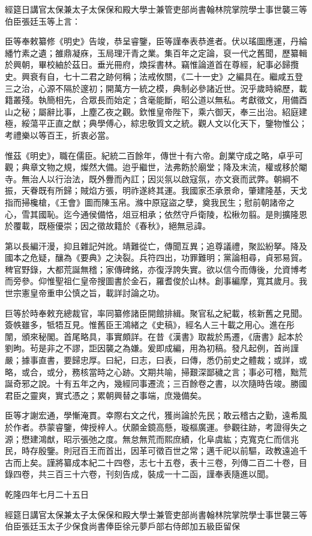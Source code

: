 
\begin{pinyinscope}
經筵日講官太保兼太子太保保和殿大學士兼管吏部尚書翰林院掌院學士事世襲三等伯臣張廷玉等上言：

臣等奉敕纂修《明史》告竣，恭呈睿鑒，臣等謹奉表恭進者。伏以瑤圖應運，丹綸繙竹素之遺；雒鼎凝庥，玉局理汗青之業。集百年之定論，裒一代之舊聞，歷纂輯於興朝，畢校紬於茲日。垂光冊府，煥採書林。竊惟論道首在尊經，紀事必歸攬史。興衰有自，七十二君之跡何稱；法戒攸關，《二十一史》之編具在。繼咸五登三之治，心源不隔於邃初；開萬方一統之模，典制必參諸近世。況乎歲時綿歷，載籍叢殘。執簡相先，合眾長而始定；含毫能斷，昭公道以無私。考獻徵文，用備酉山之秘；屬辭比事，上塵乙夜之觀。欽惟皇帝陛下，乘六御天，奉三出治。紹庭建極，綏蕩平正直之猷；典學傅心，綜忠敬質文之統。觀人文以化天下，鑒物惟公；考禮樂以等百王，折衷必當。

惟茲《明史》，職在儒臣。紀統二百餘年，傳世十有六帝。創業守成之略，卓乎可觀；典章文物之規，燦然大備。迨乎繼世，法弗飭於廟堂；降及末流，權或移於閹寺。無治人以行治法，既外釁而內訌；因災氛以啟寇氛，亦文衰而武弊。朝綱不振，天眷既有所歸；賊焰方張，明祚遂終其運。我國家丕承景命，肇建隆基，天戈指而掃欃槍，《王會》圖而陳玉帛。滌中原寇盜之孽，奠我民生；慰前朝諸帝之心，雪其國恥。迄今通侯備恪，俎豆相承；依然守戶衛陵，松楸勿翦。是則擴隆恩於覆載，既極優崇；因之徵故籍於《春秋》，絕無忌諱。

第以長編汗漫，抑且雜記舛訛。靖難從亡，傳聞互異；追尊議禮，聚訟紛拏。降及國本之危疑，釀為《要典》之決裂。兵符四出，功罪難明；黨論相尋，貞邪易貿。稗官野錄，大都荒誕無稽；家傳碑銘，亦復浮誇失實。欲以信今而傳後，允資博考而旁參。仰惟聖祖仁皇帝搜圖書於金石，羅耆俊於山林。創事編摩，寬其歲月。我世宗憲皇帝重申公慎之旨，載詳討論之功。

巨等於時奉敕充總裁官，率同纂修諸臣開館排緝。聚官私之紀載，核新舊之見聞。簽帙雖多，牴牾互見。惟舊臣王鴻緒之《史稿》，經名人三十載之用心。進在彤闈，頒來秘閣。首尾略具，事實頗詳。在昔《漢書》取裁於馬遷，《唐書》起本於劉昫。茍是非之不謬，詎因襲之為嫌。爰即成編，用為初稿。發凡起例，首尚謹嚴；據事直書，要歸忠厚。曰紀，曰志，曰表，曰傳，悉仍前史之體裁；或詳，或略，或合，或分，務核當時之心跡。文期共喻，掃艱深鄙穢之言；事必可稽，黜荒誕奇邪之說。十有五年之內，幾經同事遷流；三百餘卷之書，以次隨時告竣。勝國君臣之靈爽，實式憑之；累朝興替之事端，庶幾備矣。

臣等才謝宏通，學慚淹貫。幸際右文之代，獲尚論於先民；敢云稽古之勤，遠希風於作者。恭蒙睿鑒，俾授梓人。伏願金鏡高懸，璇樞廣運。參觀往跡，考證得失之源；懋建鴻猷，昭示張弛之度。無怠無荒而熙庶績，化阜虞紘；克寬克仁而信兆民，時存殷鑒。則冠百王而首出，因革可徵百世之常；邁千祀以前驅，政教遠追千古而上矣。謹將纂成本紀二十四卷，志七十五卷，表十三卷，列傳二百二十卷，目錄四卷，共三百三十六卷，刊刻告成，裝成一十二函，謹奉表隨進以聞。

乾隆四年七月二十五日

經筵日講官太保兼太子太保保和殿大學士兼管吏部尚書翰林院掌院學士事世襲三等伯臣張廷玉太子少保食尚書俸臣徐元夢戶部右侍郎加五級臣留保


\end{pinyinscope}